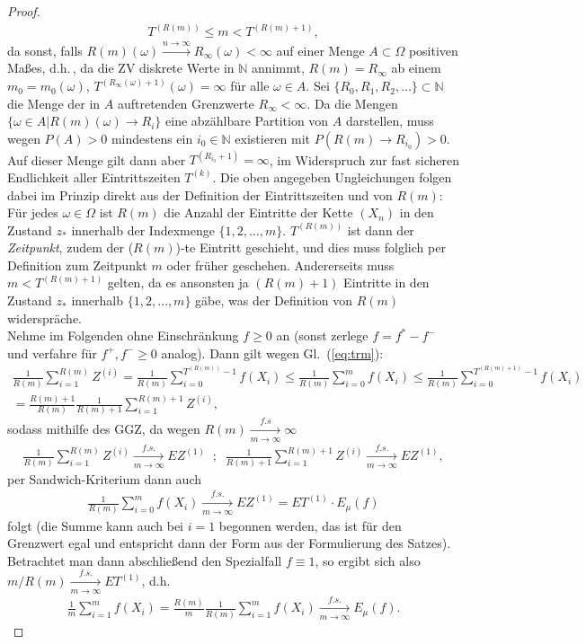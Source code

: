 \documentclass[twoside]{article}
\theoremstyle{definition}
\begin{document}
\begin{proof}
\begin{align}
T^{(R(m))} \leq m < T^{(R(m)+1)}, \label{eq:trm}
\end{align}
da sonst, falls $R(m)(\omega) \xrightarrow{n \to \infty} R_\infty(\omega) < \infty$ auf einer Menge $A \subset \Omega$ positiven Maßes, d.h.\,, da die ZV diskrete Werte in $\mathbb{N}$ annimmt, $R(m) = R_\infty$ ab einem $m_0 = m_0(\omega)$, $T^{(R_\infty(\omega)+1)}(\omega) = \infty$ für alle $\omega \in A$. Sei $\{R_0,R_1,R_2,\dots \} \subset \mathbb{N}$ die Menge der in $A$ auftretenden Grenzwerte $R_\infty < \infty$. Da die Mengen $\{\omega \in A | R(m)(\omega) \to R_i\}$ eine abzählbare Partition von $A$ darstellen, muss wegen $P(A)>0$ mindestens ein $i_0 \in \mathbb{N}$ existieren mit $P(R(m) \to R_{i_0})>0$. Auf dieser Menge gilt dann aber $T^{(R_{i_0}+1)}=\infty$, im Widerspruch zur fast sicheren Endlichkeit aller Eintrittszeiten $T^{(k)}$. Die oben angegeben Ungleichungen folgen dabei im Prinzip direkt aus der Definition der Eintrittszeiten und von $R(m)$: Für jedes $\omega \in \Omega$ ist $R(m)$ die Anzahl der Eintritte der Kette $(X_n)$ in den Zustand $z_*$ innerhalb der Indexmenge $\{1,2,\dots,m \}$. $T^{(R(m))}$ ist dann der \textit{Zeitpunkt}, zudem der ($R(m)$)-te Eintritt geschieht, und dies muss folglich per Definition zum Zeitpunkt $m$ oder früher geschehen. Andererseits muss $m < T^{(R(m)+1)}$ gelten, da es ansonsten ja $(R(m)+1)$ Eintritte in den Zustand $z_*$ innerhalb $\{1,2,\dots,m\}$ gäbe, was der Definition von $R(m)$ widerspräche.\\
Nehme im Folgenden ohne Einschränkung $f \geq 0$ an (sonst zerlege $f=f^*-f^-$ und verfahre für $f^+,f^- \geq 0$ analog). Dann gilt wegen Gl.\ (\ref{eq:trm}):
\begin{align}
\frac{1}{R(m)} \sum_{i=1}^{R(m)} Z^{(i)} = \frac{1}{R(m)} \sum_{i=0}^{T^{(R(m))}-1} f(X_i) \leq \frac{1}{R(m)} \sum_{i=0}^m f(X_i) \leq \frac{1}{R(m)} \sum_{i=0}^{T^{(R(m)+1)}-1} f(X_i)\\
= \frac{R(m)+1}{R(m)} \frac{1}{R(m)+1} \sum_{i=1}^{R(m)+1} Z^{(i)},
\end{align}
sodass mithilfe des GGZ, da wegen $R(m) \xrightarrow[m \to \infty]{f.s} \infty$
\begin{align}
\frac{1}{R(m)} \sum_{i=1}^{R(m)} Z^{(i)} \xrightarrow[m \to \infty]{f.s.} EZ^{(1)} \; \; ; \; \; \frac{1}{R(m)+1} \sum_{i=1}^{R(m)+1} Z^{(i)} \xrightarrow[m \to \infty]{f.s.} EZ^{(1)},
\end{align}
per Sandwich-Kriterium dann auch 
\begin{align}
\frac{1}{R(m)} \sum_{i=0}^m f(X_i) \xrightarrow[m \to \infty]{f.s.} EZ^{(1)} = ET^{(1)} \cdot E_\mu(f)
\end{align}
folgt (die Summe kann auch bei $i=1$ begonnen werden, das ist für den Grenzwert egal und entspricht dann der Form aus der Formulierung des Satzes). Betrachtet man dann abschließend den Spezialfall $f \equiv 1$, so ergibt sich also $m/R(m) \xrightarrow[m \to \infty]{f.s.} ET^{(1)}$, d.h. 
\begin{align}
\frac{1}{m} \sum_{i=1}^{m} f(X_i) = \frac{R(m)}{m} \frac{1}{R(m)} \sum_{i=1}^{m} f(X_i) \xrightarrow[m \to \infty]{f.s.} E_\mu(f).
\end{align}
\end{proof}
\end{document}
